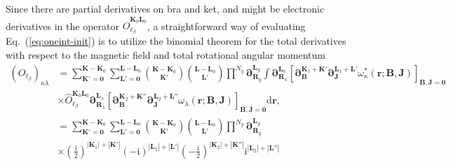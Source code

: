 \documentclass[a4paper,11pt,twoside,openright]{book}
\begin{document}
Since there are partial derivatives on bra and ket, and might be electronic derivatives in the operator
$\hat{O}_{\ell_{\beta}}^{\boldsymbol{K}_{0}\boldsymbol{L}_{0}}$, a straightforward way of evaluating
Eq.~(\ref{eq:oneint-init}) is to utilize the binomial theorem for the total derivatives with respect to the
magnetic field and total rotational angular momentum~\cite{bgkr}
\begin{align}
  (O_{\ell_{\beta}})_{\kappa\lambda}
  \label{eq:oneint-binom}
  &=\sum_{\boldsymbol{K}'=\boldsymbol{0}}^{\boldsymbol{K}-\boldsymbol{K}_{0}}%
    \sum_{\boldsymbol{L}'=\boldsymbol{0}}^{\boldsymbol{L}-\boldsymbol{L}_{0}}%
    \binom{\boldsymbol{K}-\boldsymbol{K}_{0}}{\boldsymbol{K}'}%
    \binom{\boldsymbol{L}-\boldsymbol{L}_{0}}{\boldsymbol{L}'}%
    \prod^{N_{g}}\boldsymbol{\partial}_{\boldsymbol{R}_{g}}^{\boldsymbol{L}_{g}}%
    \int\boldsymbol{\partial}_{\boldsymbol{R}_{\kappa}}^{\boldsymbol{L}_{\kappa}}%
      \left[\boldsymbol{\partial}_{\boldsymbol{B}}^{\boldsymbol{K}_{1}+\boldsymbol{K}'}%
        \boldsymbol{\partial}_{\boldsymbol{J}}^{\boldsymbol{L}_{1}+\boldsymbol{L}'}%
        \omega_{\kappa}^\ast(\boldsymbol{r};\boldsymbol{B},%
          \boldsymbol{J})\right]_{\boldsymbol{B},\boldsymbol{J}=\boldsymbol{0}}\\
  &\times\hat{O}_{\ell_{\beta}}^{\boldsymbol{K}_{0}\boldsymbol{L}_{0}}%
    \boldsymbol{\partial}_{\boldsymbol{R}_{\lambda}}^{\boldsymbol{L}_{\lambda}}%
      \left[\boldsymbol{\partial}_{\boldsymbol{B}}^{\boldsymbol{K}_{2}+\boldsymbol{K}''}%
        \boldsymbol{\partial}_{\boldsymbol{J}}^{\boldsymbol{L}_{2}+\boldsymbol{L}''}%
        \omega_{\lambda}(\boldsymbol{r};\boldsymbol{B},\boldsymbol{J})\right]_{\boldsymbol{B},\boldsymbol{J}=\boldsymbol{0}}%
      \mathrm{d}\boldsymbol{r},\nonumber\\
  \label{eq:contracted-lao-int}
  &=\sum_{\boldsymbol{K}'=\boldsymbol{0}}^{\boldsymbol{K}-\boldsymbol{K}_{0}}%
    \sum_{\boldsymbol{L}'=\boldsymbol{0}}^{\boldsymbol{L}-\boldsymbol{L}_{0}}
    \binom{\boldsymbol{K}-\boldsymbol{K}_{0}}{\boldsymbol{K}'}%
    \binom{\boldsymbol{L}-\boldsymbol{L}_{0}}{\boldsymbol{L}'}%
    \prod^{N_{g}}\boldsymbol{\partial}_{\boldsymbol{R}_{g}}^{\boldsymbol{L}_{g}}\\
  &\times\left(\tfrac{\text{i}}{2}\right)^{|\boldsymbol{K}_{1}|+|\boldsymbol{K}'|}%
    \left(-\text{i}\right)^{|\boldsymbol{L}_{1}|+|\boldsymbol{L}'|}%
    \left(-\tfrac{\text{i}}{2}\right)^{|\boldsymbol{K}_{2}|+|\boldsymbol{K}''|}%
    \text{i}^{|\boldsymbol{L}_{2}|+|\boldsymbol{L}''|}\nonumber\\

\end{align}
\end{document}
